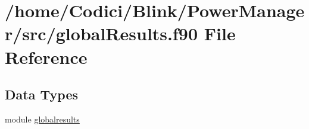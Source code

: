 \hypertarget{global_results_8f90}{\section{/home/\-Codici/\-Blink/\-Power\-Manager/src/global\-Results.f90 File Reference}
\label{global_results_8f90}
}
\subsection*{Data Types}
\begin{DoxyCompactItemize}
\item 
module \hyperlink{classglobalresults}{globalresults}
\end{DoxyCompactItemize}
